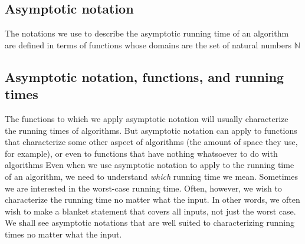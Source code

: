 \documentclass{report}
\begin{document}
        \subsection{Asymptotic notation}
        \bigbreak \noindent 
        The notations we use to describe the asymptotic running time of an algorithm are defined in terms of functions whose domains are the set of natural numbers $\mathbb{N}$
        \bigbreak \noindent 
        \subsection{Asymptotic notation, functions, and running times}
        \bigbreak \noindent 
        The functions to which we apply asymptotic notation will usually characterize the running times of algorithms. But asymptotic notation can apply to functions that characterize some other aspect of algorithms (the amount of space they use, for example), or even to functions that have nothing whatsoever to do with algorithms
        \bigbreak \noindent 
        Even when we use asymptotic notation to apply to the running time of an algorithm, we need to understand \textit{which} running time we mean. Sometimes we are interested in the worst-case running time. Often, however, we wish to characterize the running time no matter what the input. In other words, we often wish to make a blanket statement that covers all inputs, not just the worst case. We shall see asymptotic notations that are well suited to characterizing running times no matter what the input.
        \bigbreak \noindent 
\end{document}
